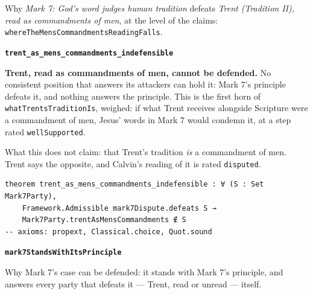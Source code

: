 \documentclass[11pt]{article}
\begin{document}
\noindent Why \emph{Mark 7: God’s word judges human tradition} defeats \emph{Trent (Tradition II), read as commandments of men}, at the level of the claims: \texttt{where\allowbreak{}The\allowbreak{}Mens\allowbreak{}Commandments\allowbreak{}Reading\allowbreak{}Falls}.
\par\medskip\noindent\textbf{\texttt{trent\_\allowbreak{}as\_\allowbreak{}mens\_\allowbreak{}commandments\_\allowbreak{}indefensible}}\par\nobreak\noindent
\textbf{Trent, read as commandments of men, cannot be defended.} No consistent position that answers its attackers can hold it: Mark 7’s principle defeats it, and nothing answers the principle. This is the first horn of \texttt{what\allowbreak{}Trents\allowbreak{}Tradition\allowbreak{}Is}, weighed: if what Trent receives alongside Scripture were a commandment of men, Jesus’ words in Mark 7 would condemn it, at a step rated \texttt{well\allowbreak{}Supported}.

What this does not claim: that Trent’s tradition \emph{is} a commandment of men. Trent says the opposite, and Calvin’s reading of it is rated \texttt{disputed}.

{\small\begin{verbatim}
theorem trent_as_mens_commandments_indefensible : ∀ (S : Set Mark7Party),
    Framework.Admissible mark7Dispute.defeats S →
    Mark7Party.trentAsMensCommandments ∉ S
-- axioms: propext, Classical.choice, Quot.sound
\end{verbatim}}
\par\medskip\noindent\textbf{\texttt{mark7\allowbreak{}Stands\allowbreak{}With\allowbreak{}Its\allowbreak{}Principle}}\par\nobreak\noindent
Why Mark 7’s case can be defended: it stands with Mark 7’s principle, and answers every party that defeats it — Trent, read or unread — itself.
\end{document}
